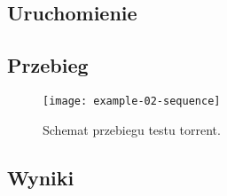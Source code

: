 \documentclass[00-praca-magisterska.tex]{subfiles}
\begin{document}
\subsection{Uruchomienie}


\subsection{Przebieg}


\begin{figure}[htb]
\begin{center}
\leavevmode
\texttt{[image: example-02-sequence]}
\end{center}
\caption{Schemat przebiegu testu torrent.}
\label{fig:example-02-sequence}
\end{figure}

\subsection{Wyniki}

\end{document}
